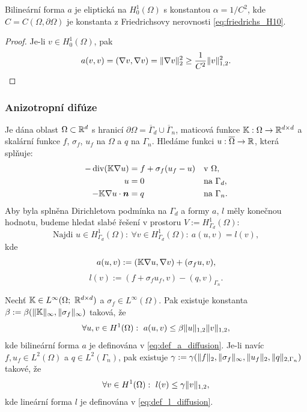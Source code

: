 \begin{veta}
Bilineární forma $a$ je eliptická na $H^1_0(\Omega)$ s konstantou $\alpha=1/C^2$, kde $C=C(\Omega,\partial\Omega)$ je konstanta z Friedrichsovy nerovnosti \eqref{eq:friedrichs_H10}.
\end{veta}
\begin{proof}
Je-li $v\in H^1_0(\Omega)$, pak
\[ a(v,v) = (\nabla v,\nabla v) = \|\nabla v\|_2^2 \ge \frac1{C^2}\|v\|_{1,2}^2. \]
\end{proof}






\subsubsection{Anizotropní difúze}
Je dána oblast $\Omega\subset\mathbb R^d$ s hranicí $\partial\Omega=\overline\Gamma_d\cup\overline\Gamma_n$, maticová funkce ${\mathbb{K}}:\Omega\rightarrow\mathbb R^{d\times d}$ a skalární funkce $f$, $\sigma_f$, $u_f$ na $\Omega$ a $q$ na $\Gamma_n$.
Hledáme funkci $u:\overline\Omega\rightarrow\mathbb R$, která splňuje:
\[ \begin{aligned}
-\operatorname{div}({\mathbb{K}}\nabla u) &= f + \sigma_f(u_f - u) &&\text{v }\Omega,\\
u&=0 && \text{na }\Gamma_d,\\
-{\mathbb{K}} \nabla u \cdot \mathbf{\boldsymbol{n}} &= q &&\text{na }\Gamma_n.
\end{aligned} \]
Aby byla splněna Dirichletova podmínka na $\Gamma_d$ a formy $a$, $l$ měly konečnou hodnotu, budeme hledat slabé řešení v prostoru $V:=H^1_{\Gamma_d}(\Omega)$:
\[ \mbox{Najdi }u\in H^1_{\Gamma_d}(\Omega):~\forall v\in H^1_{\Gamma_d}(\Omega):~a(u,v)=l(v), \]
kde
\begin{equation}\label{eq:def_a_diffusion}
a(u,v) := ({\mathbb{K}}\nabla u, \nabla v) + (\sigma_f u, v),
\end{equation}
\begin{equation}\label{eq:def_l_diffusion}
l(v) := (f + \sigma_f u_f,v) - ( q, v)_{\Gamma_n}.
\end{equation}
\begin{veta}
Nechť ${\mathbb{K}}\in L^\infty(\Omega;~\mathbb R^{d\times d})$ a $\sigma_f\in L^\infty(\Omega)$. Pak existuje konstanta $\beta:=\beta(\|{\mathbb{K}}\|_\infty,\|\sigma_f\|_\infty)$ taková, že
\[ \forall u,v\in H^1(\Omega):~a(u,v) \le \beta \|u\|_{1,2}\|v\|_{1,2}, \]
kde bilineární forma $a$ je definována v \eqref{eq:def_a_diffusion}.
Je-li navíc $f,u_f\in L^2(\Omega)$ a $q\in L^2(\Gamma_n)$, pak existuje $\gamma:=\gamma(\|f\|_2,\|\sigma_f\|_\infty,\|u_f\|_2,\|q\|_{2,\Gamma_n})$ takové, že
\[ \forall v\in H^1(\Omega):~l(v) \le \gamma\|v\|_{1,2}, \]
kde lineární forma $l$ je definována v \eqref{eq:def_l_diffusion}.
\end{veta}
